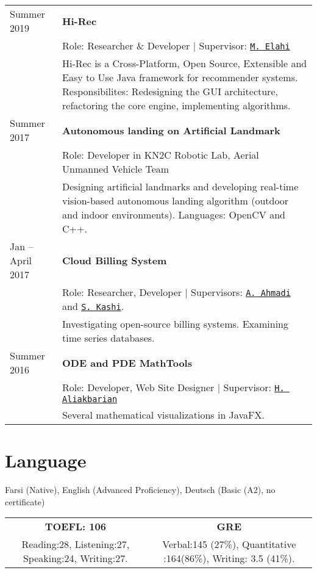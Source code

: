 \documentclass[letterpaper]{article}
\begin{document}
{{\renewcommand{\arraystretch}{1.2}
\begin{tabular}{l p{15cm}}
Summer 2019  & \textbf{Hi-Rec} \\ & Role: Researcher \& Developer | Supervisor: \href{https://scholar.google.com/citations?user=aUWF7LYAAAAJ&hl=en}{\tt M. Elahi} \\&Hi-Rec is a Cross-Platform, Open Source, Extensible and Easy to Use Java framework for recommender systems. Responsibilites: Redesigning the GUI architecture, refactoring the core engine, implementing algorithms.
\\
Summer 2017 & \textbf{Autonomous landing on Artificial Landmark} \\ & Role: Developer in KN2C Robotic Lab, Aerial Unmanned Vehicle Team \\&Designing artificial landmarks and developing real-time vision-based autonomous landing algorithm (outdoor and indoor environments). Languages: OpenCV and C++.
\\
Jan – April 2017 & \textbf{Cloud Billing System} \\& Role: Researcher, Developer | Supervisors: \href{http://wp.kntu.ac.ir/ahmadi/}{\tt A. Ahmadi} and \href{http://wp.kntu.ac.ir/sedighian/}{\tt  S. Kashi}.
\\&
Investigating open-source billing systems. Examining time series databases.
\\
Summer 2016 &  \textbf{ODE and PDE MathTools} \\&
Role: Developer, Web Site Designer | Supervisor: \href{http://wp.kntu.ac.ir/aliakbarian/}{\tt H. Aliakbarian} \\&
Several mathematical visualizations in JavaFX.

\end{tabular}

\section*{Language}

Farsi (Native), English (Advanced Proficiency), Deutsch (Basic (A2), no certificate)\newline



\begin{tabular}{|c|c|}
\textbf{TOEFL: 106} & \textbf{GRE} \\
Reading:28, Listening:27, Speaking:24, Writing:27. & Verbal:145 (27\%), Quantitative :164(86\%), Writing: 3.5 (41\%).\\
\end{tabular}

}}
\end{document}
